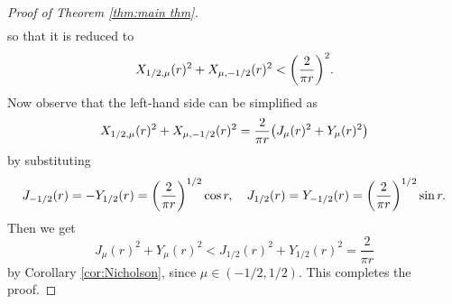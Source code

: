 \documentclass[reqno,letterpaper]{amsart}
\numberwithin{equation}{section}
\theoremstyle{plain}
\newcommand{\BesselJ}[1]{J_{#1}}
\newcommand{\BesselY}[1]{Y_{#1}}
\newcommand{\crossmunu}[2]{X_{#1, #2}}
\newcommand{\intervaloo}[2]{(#1, #2)}
\begin{document}
\begin{proof}[Proof of Theorem \ref{thm:main thm}]
\begin{align}
		\end{align}
		so that it is reduced to
		\begin{equation} \label{eq:sufficient for L=1}
			\crossmunu{1/2}{\mu}(r)^2 + \crossmunu{\mu}{-1/2}(r)^2 < \mleft(\frac{2}{\pi r}\mright)^2 .
		\end{equation}
		Now observe that the left-hand side can be simplified as
		\begin{equation}
			\crossmunu{1/2}{\mu}(r)^2 + \crossmunu{\mu}{-1/2}(r)^2 = \frac{2}{\pi r} \mleft( \BesselJ{\mu}(r)^2 + \BesselY{\mu}(r)^2 \mright) 
		\end{equation}
		by substituting
		\begin{equation}
			\BesselJ{-1/2}(r) = - \BesselY{1/2}(r) = \mleft( \frac{2}{\pi r} \mright)^{1/2} \cos{r} , \quad \BesselJ{1/2}(r) = \BesselY{-1/2}(r) = \mleft( \frac{2}{\pi r} \mright)^{1/2} \sin{r} .
		\end{equation}
		Then we get
		\begin{equation}
			\BesselJ{\mu}(r)^2 + \BesselY{\mu}(r)^2 < \BesselJ{1/2}(r)^2 + \BesselY{1/2}(r)^2 = \frac{2}{\pi r} 
		\end{equation}
		by Corollary \ref{cor:Nicholson}, since $\mu \in \intervaloo{-1/2}{1/2}$.
		This completes the proof.
	\end{proof}
\end{document}
